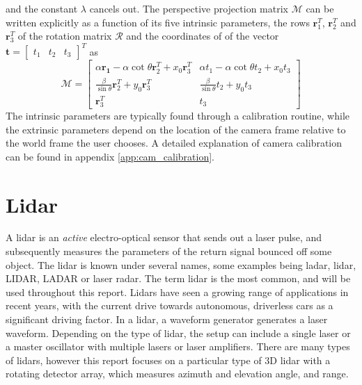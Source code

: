and the constant $\lambda$ cancels out. The perspective projection matrix $\mathcal{M}$ can be written explicitly as a function of its five intrinsic parameters, the rows $\mathbf{r}_1^T$, $\mathbf{r}_2^T$ and $\mathbf{r}_3^T$ of the rotation matrix $\mathcal{R}$ and the coordinates of of the vector $\mathbf{t}=\begin{bmatrix}t_1 & t_2 & t_3\end{bmatrix}^T$ as 
\begin{equation}
    \mathcal{M}=\begin{bmatrix}\alpha\mathbf{r_1}-\alpha\cot{\theta}\mathbf{r}_2^T+x_0\mathbf{r}_3^T & \alpha t_1-\alpha\cot{\theta}t_2+x_0t_3\\ \frac{\beta}{\sin{\theta}}\mathbf{r}_2^T + y_0\mathbf{r}_3^T & \frac{\beta}{\sin{\theta}}t_2+y_0t_3 \\
    \mathbf{r}_3^T & t_3\end{bmatrix}
\end{equation}
The intrinsic parameters are typically found through a calibration routine, while the extrinsic parameters depend on the location of the camera frame relative to the world frame the user chooses. A detailed explanation of camera calibration can be found in appendix \ref{app:cam_calibration}.
\section{Lidar}
A lidar is an \textit{active} electro-optical sensor that sends out a laser pulse, and subsequently measures the parameters of the return signal bounced off some object. The lidar is known under several names, some examples being ladar, lidar, LIDAR, LADAR or laser radar. The term lidar is the most common, and will be used throughout this report. Lidars have seen a growing range of applications in recent years, with the current drive towards autonomous, driverless cars as a significant driving factor. In a lidar, a waveform generator generates a laser waveform. Depending on the type of lidar, the setup can include a single laser or a master oscillator with multiple lasers or laser amplifiers. There are many types of lidars, however this report focuses on a particular type of 3D lidar with a rotating detector array, which measures azimuth and elevation angle, and range. 


